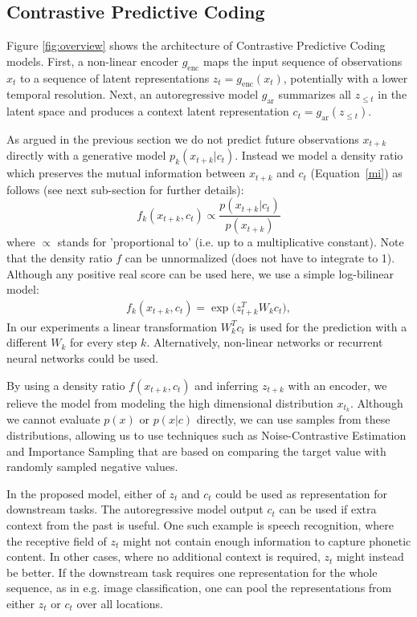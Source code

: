 \subsection{Contrastive Predictive Coding}
\label{model_math}

Figure \ref{fig:overview} shows the architecture of Contrastive Predictive Coding models. First, a non-linear encoder $g_{\text{enc}}$ maps the input sequence of observations $x_t$ to a sequence of latent representations $z_t=g_{\text{enc}}(x_t)$, potentially with a lower temporal resolution. Next, an autoregressive model $g_{\text{ar}}$ summarizes all $z_{\leq t}$ in the latent space and produces a context latent representation $c_t=g_{\text{ar}}(z_{\leq t})$.

As argued in the previous section we do not predict future observations $x_{t+k}$ directly with a generative model $p_k(x_{t+k}| c_t)$. Instead we model a density ratio which preserves the mutual information between $x_{t+k}$ and $c_t$ (Equation~\ref{mi}) as follows (see next sub-section for further details):
\begin{equation}
f_k(x_{t+k}, c_{t}) \propto \frac{p(x_{t+k}| c_t)}{p(x_{t+k})} \label{math:density_ratio}
\end{equation}
where $\propto$ stands for 'proportional to' (i.e. up to a multiplicative constant). Note that the density ratio $f$ can be unnormalized (does not have to integrate to 1). Although any positive real score can be used here, we use a simple log-bilinear model:
\begin{align}
f_k(x_{t+k}, c_{t}) = \exp \Big(z_{t+k}^T W_k c_t\Big),
\end{align}
In our experiments a linear transformation $W_k^T c_t$ is used for the prediction with a different $W_k$ for every step $k$. Alternatively, non-linear networks or recurrent neural networks could be used.

By using a density ratio $f(x_{t+k}, c_{t})$ and inferring $z_{t+k}$ with an encoder, we relieve the model from modeling the high dimensional distribution $x_{t_k}$. Although we cannot evaluate $p(x)$ or $p(x|c)$ directly, we can use samples from these distributions, allowing us to use techniques such as Noise-Contrastive Estimation \cite{gutmann2010noise, mnih2012fast, jozefowicz2016exploring} and Importance Sampling \cite{bengio2008is} that are based on comparing the target value with randomly sampled negative values.

In the proposed model, either of $z_t$ and $c_t$ could be used as representation for downstream tasks.
The autoregressive model output $c_t$ can be used if extra context from the past is useful. One such example is speech recognition, where the receptive field of $z_t$ might not contain enough information to capture phonetic content. In other cases, where no additional context is required, $z_t$ might instead be better. If the downstream task requires one representation for the whole sequence, as in e.g. image classification, one can pool the representations from either $z_t$ or $c_t$ over all locations. 

